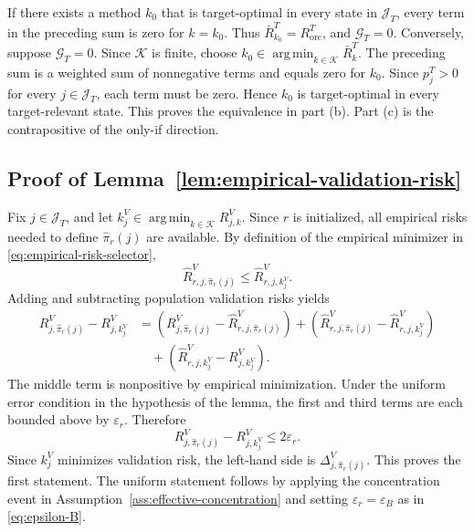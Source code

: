 \documentclass[a4paper, 12pt]{article}
\theoremstyle{plain}
\theoremstyle{remark}
\DeclareMathOperator*{\argmin}{arg\,min}
\newcommand{\Kcal}{\mathcal{K}}
\newcommand{\1}{\mathbf{1}}
\begin{document}
If there exists a method \(k_0\) that is target-optimal in every state in \(\mathcal J_T\), every term in the preceding sum is zero for \(k=k_0\). Thus \(\bar R^T_{k_0}=R^T_{\mathrm{orc}}\), and \(\mathcal G_T=0\). Conversely, suppose \(\mathcal G_T=0\). Since \(\Kcal\) is finite, choose \(k_0\in\argmin_{k\in\Kcal}\bar R^T_k\). The preceding sum is a weighted sum of nonnegative terms and equals zero for \(k_0\). Since \(p^T_j>0\) for every \(j\in\mathcal J_T\), each term must be zero. Hence \(k_0\) is target-optimal in every target-relevant state. This proves the equivalence in part (b). Part (c) is the contrapositive of the only-if direction.

\subsection*{Proof of Lemma~\ref{lem:empirical-validation-risk}}
Fix \(j\in\mathcal J_T\), and let \(k^V_j\in\argmin_{k\in\Kcal}R^V_{j,k}\). Since \(r\) is initialized, all empirical risks needed to define \(\widehat\pi_r(j)\) are available. By definition of the empirical minimizer in \eqref{eq:empirical-risk-selector},
\begin{equation*}
    \widehat R^V_{r,j,\widehat\pi_r(j)}
    \leq
    \widehat R^V_{r,j,k^V_j} .
\end{equation*}
Adding and subtracting population validation risks yields
\begin{equation*}
\begin{aligned}
    R^V_{j,\widehat\pi_r(j)}-R^V_{j,k^V_j}
    &=
    \left(R^V_{j,\widehat\pi_r(j)}-\widehat R^V_{r,j,\widehat\pi_r(j)}\right)
    +
    \left(\widehat R^V_{r,j,\widehat\pi_r(j)}-\widehat R^V_{r,j,k^V_j}\right)
    \\
    &\quad+
    \left(\widehat R^V_{r,j,k^V_j}-R^V_{j,k^V_j}\right) .
\end{aligned}
\end{equation*}
The middle term is nonpositive by empirical minimization. Under the uniform error condition in the hypothesis of the lemma, the first and third terms are each bounded above by \(\varepsilon_r\). Therefore
\begin{equation*}
    R^V_{j,\widehat\pi_r(j)}-R^V_{j,k^V_j}\leq2\varepsilon_r .
\end{equation*}
Since \(k^V_j\) minimizes validation risk, the left-hand side is \(\Delta^V_{j,\widehat\pi_r(j)}\). This proves the first statement. The uniform statement follows by applying the concentration event in Assumption~\ref{ass:effective-concentration} and setting \(\varepsilon_r=\varepsilon_B\) as in \eqref{eq:epsilon-B}.
\end{document}

